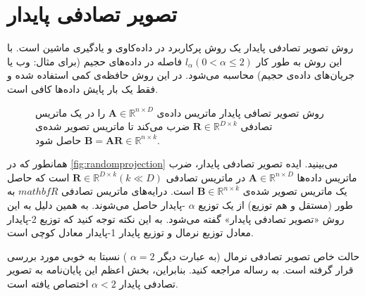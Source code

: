 \chapter{
تصویر تصادفی پایدار
}

روش تصویر تصادفی پایدار%
\cite{litez116, litez166, litez19, litez99, litez96, litez104}
یک روش پرکاربرد در داده‌کاوی و یادگیری ماشین است. با این روش به طور کار 
$l_\alpha (0 < \alpha \leq 2)$
فاصله در داده‌های حجیم (برای مثال: وب یا جریان‌های داده‌ی حجیم) محاسبه می‌شود. در این روش حافظه‌ی کمی استفاده شده و فقط یک بار پایش داده‌ها کافی است. 

\begin{figure}[h]
\centering
\begin{latin}
\end{latin}
\caption{
روش تصویر تصافی پایدار ماتریس داده‌ی 
$\mathbf{A} \in \mathbb{R}^{n \times D}$
را در یک ماتریس تصادفی
$\mathbf{R} \in \mathbb{R}^{D \times k}$
ضرب می‌کند تا ماتریس تصویر شده‌ی 
$\mathbf{B} = \mathbf{AR} \in \mathbb{R}^{n \times k}$
حاصل شود.
}
\label{fig:randomprojection}
\end{figure}

همانطور که در 
\autoref{fig:randomprojection}
می‌بینید. ایده تصویر تصادفی پایدار، ضرب ماتریس داده‌ها
$\mathbf{A} \in \mathbb{R}^{n \times D}$
در ماتریس تصادفی 
$\mathbf{R} \in \mathbb{R}^{D \times k}  (k \ll D)$
است که حاصل یک ماتریس تصویر شده‌ی 
$\mathbf{B} \in \mathbb{R}^{n \times k}$
است. درایه‌های ماتریس تصادفی 
$mathbf{R}$
به طور 
(مستقل و هم توزیع)%
از یک توزیع 
$\alpha$
-پایدار %
حاصل می‌شوند. به همین دلیل به این روش «تصویر تصادفی پایدار» گفته می‌شود. به این نکته توجه کنید که توزیع 2-پایدار معادل توزیع نرمال و توزیع پایدار 1-پایدار معادل کوچی%
است.

حالت خاص تصویر تصادفی نرمال (به عبارت دیگر
$\alpha = 2$
) نسبتا به خوبی مورد بررسی قرار گرفته است. به رساله
\cite{litez166}
مراجعه کنید. بنابراین، بخش اعظم این پایان‌نامه به تصویر تصادفی پایدار 
$\alpha < 2$
اختصاص یافته است.


